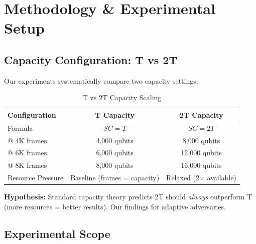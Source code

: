 \section{Methodology \& Experimental Setup}

\subsection{Capacity Configuration: T vs 2T}

Our experiments systematically compare two capacity settings:

\vspace{-0.4cm}
\begin{table}[h]
\scriptsize
\centering
\begin{tabular}{lcc}
\toprule
\textbf{Configuration} & \textbf{T Capacity} & \textbf{2T Capacity} \\
\midrule
Formula & $SC = T$ & $SC = 2T$ \\
@ 4K frames & 4,000 qubits & 8,000 qubits \\
@ 6K frames & 6,000 qubits & 12,000 qubits \\
@ 8K frames & 8,000 qubits & 16,000 qubits \\
Resource Pressure & Baseline (frames = capacity) & Relaxed (2× available) \\
\bottomrule
\end{tabular}
\vspace{-0.2cm}
\caption{T vs 2T Capacity Scaling}
\end{table}

\vspace{-0.2cm}
\textbf{Hypothesis:} Standard capacity theory predicts 2T should \textit{always} outperform T (more resources = better results). Our findings  for adaptive adversaries.

\subsection{Experimental Scope}

